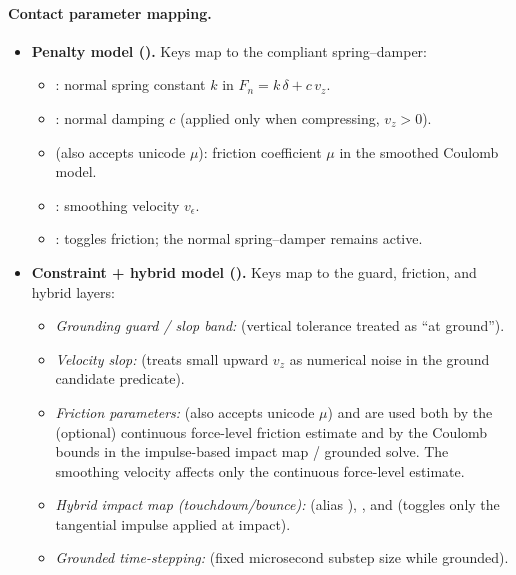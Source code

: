 \paragraph{Contact parameter mapping.}
\begin{itemize}[leftmargin=*,itemsep=2pt]
  \item \textbf{Penalty model ().} Keys map to the compliant spring--damper:
    \begin{itemize}[leftmargin=*,itemsep=1pt]
      \item {}: normal spring constant \(k\) in \(F_n = k\,\delta + c\,v_z\).
      \item {}: normal damping \(c\) (applied only when compressing, \(v_z>0\)).
      \item {} (also accepts unicode $\mu$): friction coefficient \(\mu\) in the smoothed Coulomb model.
      \item {}: smoothing velocity \(v_{\epsilon}\).
      \item {}: toggles friction; the normal spring--damper remains active.
    \end{itemize}

  \item \textbf{Constraint + hybrid model ().} Keys map to the guard, friction, and hybrid layers:
    \begin{itemize}[leftmargin=*,itemsep=1pt]
      \item \emph{Grounding guard / slop band:}  (vertical tolerance treated as ``at ground'').
      \item \emph{Velocity slop:}  (treats small upward \(v_z\) as numerical noise in the ground candidate predicate).
      \item \emph{Friction parameters:}  (also accepts unicode $\mu$) and  are used both by the (optional) continuous force-level friction estimate and by the Coulomb bounds in the impulse-based impact map / grounded solve. The smoothing velocity  affects only the continuous force-level estimate.
      \item \emph{Hybrid impact map (touchdown/bounce):}  (alias ), , and  (toggles only the tangential impulse applied at impact).
      \item \emph{Grounded time-stepping:}  (fixed microsecond substep size while grounded).
    \end{itemize}
\end{itemize}
